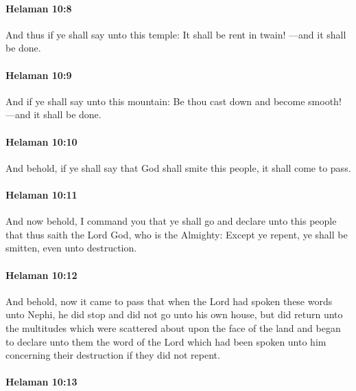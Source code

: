 		\paragraph{Helaman 10:8} %
			\label{HELAMAN-10-8}

			And thus if ye shall say unto this temple:
			It shall be rent in twain!
			---and it shall be done.

		\paragraph{Helaman 10:9} %
			\label{HELAMAN-10-9}

			And if ye shall say unto this mountain:
			Be thou cast down and become smooth!
			---and it shall be done.

		\paragraph{Helaman 10:10} %
			\label{HELAMAN-10-10}

			And behold, if ye shall say
			that God shall smite this people,
			it shall come to pass.

		\paragraph{Helaman 10:11} %
			\label{HELAMAN-10-11}

			And now behold, I command you
			that ye shall go and declare unto this people
			that thus saith the Lord God, who is the Almighty:
			Except ye repent, ye shall be smitten, even unto destruction.

		\paragraph{Helaman 10:12} %
			\label{HELAMAN-10-12}

			And behold, now it came to pass that
			when the Lord had spoken these words unto Nephi,
			he did stop and did not go unto his own house,
			but did return unto the multitudes
			which were scattered about upon the face of the land
			and began to declare unto them the word of the Lord
			which had been spoken unto him
			concerning their destruction if they did not repent.

		\paragraph{Helaman 10:13} %
			\label{HELAMAN-10-13}

